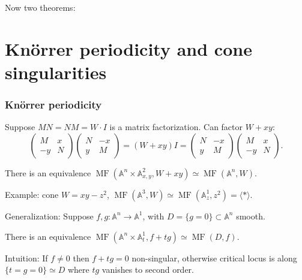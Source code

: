 \documentclass{beamer}
\DeclareMathOperator{\Crit}{Crit}
\DeclareMathOperator{\MF}{MF}
\newcommand{\A}{\mathbb{A}}
\newcommand{\Z}{\mathbb{Z}}
\newcommand{\calD}{\mathcal{D}}
\begin{document}
\begin{frame}
    Now two theorems:
\end{frame}

\section{Kn\"orrer periodicity and cone singularities}

\begin{frame}
    \frametitle{Kn\"orrer periodicity}

    Suppose $MN=NM=W\cdot I$ is a matrix factorization. \pause
    Can factor $W+xy$:
    \begin{equation*}
        \begin{pmatrix}
            M & x \\ -y & N
        \end{pmatrix}\begin{pmatrix}
            N & -x \\ y & M
        \end{pmatrix}
            = (W+xy)I =
        \begin{pmatrix}
            N & -x \\ y & M
        \end{pmatrix}\begin{pmatrix}
            M & x \\ -y & N
        \end{pmatrix}.
    \end{equation*} \pause
    \begin{theorem}
        There is an equivalence $\MF(\A^n\times\A^2_{x,y},W+xy)\simeq\MF(\A^n,W)$.
    \end{theorem} \pause

    Example: cone $W=xy-z^2$, \pause
    $\MF(\A^3,W)\simeq\MF(\A^1_z,z^2)=\langle*\rangle$. \pause

    Generalization: Suppose $f,g:\A^n\to\A^1$, with $D=\{g=0\}\subset\A^n$
    smooth. \pause
    \begin{theorem}
        There is an equivalence $\MF(\A^n\times\A^1_t,f+tg)\simeq\MF(D,f)$.
    \end{theorem} \pause

    Intuition: If $f\ne0$ then $f+tg=0$ non-singular, otherwise critical locus
    is along $\{t=g=0\}\simeq D$ where $tg$ vanishes to second order.

\end{frame}
\end{document}
